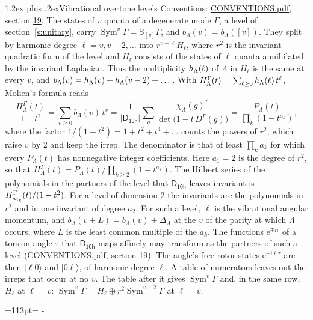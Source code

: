 \documentclass[10pt,a4paper]{article}
\makeatletter
\renewcommand\section{\@startsection{section}{1}{\z@}{-3ex plus -1ex minus -.2ex}%
  {1.2ex plus .2ex}{\normalfont\large\sffamily\bfseries\color{parttitle}}}
\newcommand{\needspace}[1]{\par\penalty-100\begingroup\dimen0=#1\relax\dimen2=\pagegoal
  \advance\dimen2-\pagetotal\ifdim\dimen0>\dimen2\relax\ifdim\dimen2>0pt\vfil\break\fi\fi
  \endgroup}
\numberwithin{equation}{section}
\newcommand{\grp}[1]{\mathsf{#1}}
\newcommand{\irr}[1]{\text{\normalfont\scshape #1}}
\newcommand{\ptag}[1]{\mathrm{#1}}
\newcommand{\iunit}{\mathrm{i}}
\newcommand{\expe}{\mathrm{e}}
\newcommand{\repD}[1]{D^{#1}}
\newcommand{\irchar}[1]{\chi_{#1}}
\newcommand{\conj}[1]{{#1}^{*}}
\newcommand{\schur}[1]{\mathbb{S}_{#1}}
\newcommand{\shape}[1]{[#1]}
\newcommand{\occ}[1]{\lvert #1\rangle}
\makeatother
\begin{document}
\section{Vibrational overtone levels}\label{s:overtones}
Conventions: \href{../../CONVENTIONS.pdf}{CONVENTIONS.pdf}, section \href{../../CONVENTIONS.pdf\#conv.19}{19}.
\leavevmode\label{n:index.quanta}\label{n:operator.symmetric.power}The states of $v$ quanta of a degenerate mode $\Gamma$, a level of section~\ref{s:unitary}, carry $\operatorname{Sym}^{v}\Gamma = \schur{\shape{v}}\Gamma$, and $b_\Lambda(v) = b_\Lambda(\shape{v})$. \label{n:local.quadratic.form}\label{n:set.harmonic}They split by harmonic degree $\ell = v, v - 2, \dots$ into $r^{v-\ell}H_\ell$, where $r^2$ is the invariant quadratic form of the level and $H_\ell$ consists of the states of $\ell$ quanta annihilated by the invariant Laplacian. \label{n:function.multiplicity.harmonic}Thus the multiplicity $\mathnormal{h}_\Lambda(\ell)$ of $\Lambda$ in $H_\ell$ is the same at every $v$, and $b_\Lambda(v) = \mathnormal{h}_\Lambda(v) + \mathnormal{h}_\Lambda(v - 2) + \dots$. \label{n:function.generating.level}With $H^{\Gamma}_\Lambda(t) = \sum_{\ell\ge0} \mathnormal{h}_\Lambda(\ell)\,t^{\ell}$, Molien's formula reads
\begin{equation}\label{e:molien}\frac{H^{\Gamma}_\Lambda(t)}{1 - t^2} = \sum_{v\ge0} b_\Lambda(v)\,t^v = \frac{1}{|\grp{D_{10h}}|}\sum_{g}\frac{\conj{\irchar{\Lambda}(g)}}{\det\bigl(1 - t\,\repD{\Gamma}(g)\bigr)} = \frac{P_\Lambda(t)}{\prod_k (1-t^{a_k})},\end{equation}
where the factor $1/(1 - t^2) = 1 + t^2 + t^4 + \dots$ counts the powers of $r^2$, which raise $v$ by 2 and keep the irrep. The denominator is that of least $\prod_k a_k$ for which every $P_\Lambda(t)$ has nonnegative integer coefficients. Here $a_1 = 2$ is the degree of $r^2$, so that $H^{\Gamma}_\Lambda(t) = P_\Lambda(t)/\prod_{k\ge2}(1 - t^{a_k})$. The Hilbert series of the polynomials in the partners of the level that $\grp{D_{10h}}$ leaves invariant is $H^{\Gamma}_{\irr{a}_{1\ptag{g}}}(t)/(1 - t^2)$. For a level of dimension 2 the invariants are the polynomials in $r^2$ and in one invariant of degree $a_2$. \label{n:index.overtone.period}\label{n:index.increment.unitary}For such a level, $\ell$ is the vibrational angular momentum, and $b_\Lambda(v + L) = b_\Lambda(v) + \Delta_\Lambda$ at the $v$ of the parity at which $\Lambda$ occurs, where $L$ is the least common multiple of the $a_k$. \label{n:local.torsion.angle}The functions $\expe^{\mp\iunit\tau}$ of a torsion angle $\tau$ that $\grp{D_{10h}}$ maps affinely may transform as the partners of such a level (\href{../../CONVENTIONS.pdf}{CONVENTIONS.pdf}, section \href{../../CONVENTIONS.pdf\#conv.19}{19}). The angle's free-rotor states $\expe^{\mp\iunit\ell\tau}$ are then $\occ{\ell 0}$ and $\occ{0 \ell}$, of harmonic degree $\ell$. A table of numerators leaves out the irreps that occur at no $v$. The table after it gives $\operatorname{Sym}^{v}\Gamma$ and, in the same row, $H_\ell$ at $\ell = v$: $\operatorname{Sym}^{v}\Gamma = H_\ell \oplus r^2\operatorname{Sym}^{v-2}\Gamma$ at $\ell = v$.
\needspace{113pt}
\end{document}
